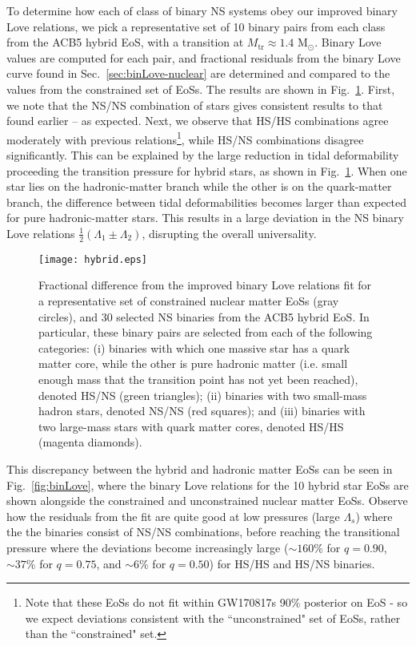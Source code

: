 \documentclass[prd,twocolumn,nofootinbib,superscriptaddress,amsmath,amssymb]{revtex4-1}
\begin{document}
To determine how each of class of binary NS systems obey our improved binary Love relations, we pick a representative set of 10 binary pairs from each class from the ACB5 hybrid EoS, with a transition at $M_{\text{tr}} \approx 1.4 \text{ M}_{\odot}$.
Binary Love values are computed for each pair, and fractional residuals from the binary Love curve found in Sec.~\ref{sec:binLove-nuclear} are determined and compared to the values from the constrained set of EoSs.
The results are shown in Fig.~\ref{fig:hybrid}.
First, we note that the NS/NS combination of stars gives consistent results to that found earlier -- as expected.
Next, we observe that HS/HS combinations agree moderately with previous relations\footnote{Note that these EoSs do not fit within GW170817s 90\% posterior on EoS - so we expect deviations consistent with the ``unconstrained" set of EoSs, rather than the ``constrained" set.}, while HS/NS combinations disagree significantly.
This can be explained by the large reduction in tidal deformability proceeding the transition pressure for hybrid stars, as shown in Fig.~\ref{fig:hybrid}.
When one star lies on the hadronic-matter branch while the other is on the quark-matter branch, 
the difference between tidal deformabilities becomes larger than expected for pure hadronic-matter stars.
This results in a large deviation in the NS binary Love relations $\frac{1}{2}(\Lambda_1 \pm \Lambda_2)$, disrupting the overall universality.

\begin{figure}
\begin{center} 
\texttt{[image: hybrid.eps]}
\end{center}
\caption{
Fractional difference from the improved binary Love relations fit for a representative set of constrained nuclear matter EoSs (gray circles), and 30 selected NS binaries from the ACB5 hybrid EoS.
In particular, these binary pairs are selected from each of the following categories: (i) binaries with which one massive star has a quark matter core, while the other is pure hadronic matter (i.e. small enough mass that the transition point has not yet been reached), denoted HS/NS (green triangles); (ii) binaries with two small-mass hadron stars, denoted NS/NS (red squares); and (iii) binaries with two large-mass stars with quark matter cores, denoted HS/HS (magenta diamonds).
}
\label{fig:hybrid}
\end{figure} 

This discrepancy between the hybrid and hadronic matter EoSs can be seen in Fig.~\ref{fig:binLove}, where the binary Love relations for the 10 hybrid star EoSs are shown alongside the constrained and unconstrained nuclear matter EoSs.
Observe how the residuals from the fit are quite good at low pressures (large $\Lambda_s$) where the the binaries consist of NS/NS combinations, before reaching the transitional pressure where the deviations become increasingly large ($\sim160$\% for $q=0.90$, $\sim37$\% for $q=0.75$, and $\sim6$\% for $q=0.50$) for HS/HS and HS/NS binaries.
\end{document}
